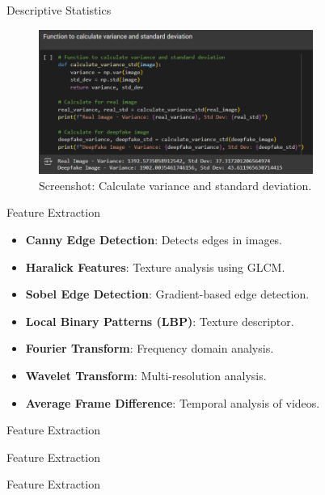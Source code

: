 \documentclass{beamer}
\begin{document}
\begin{frame}{Descriptive Statistics}
    \begin{figure}
        \centering
        \includegraphics[width=0.8\textwidth]{std.png} %
        \caption{Screenshot: Calculate variance and standard deviation.}
    \end{figure}

\end{frame}


\begin{frame}{Feature Extraction}
    \begin{itemize}
        \item \textbf{Canny Edge Detection}: Detects edges in images.
        \item \textbf{Haralick Features}: Texture analysis using GLCM.
        \item \textbf{Sobel Edge Detection}: Gradient-based edge detection.
        \item \textbf{Local Binary Patterns (LBP)}: Texture descriptor.
        \item \textbf{Fourier Transform}: Frequency domain analysis.
        \item \textbf{Wavelet Transform}: Multi-resolution analysis.
        \item \textbf{Average Frame Difference}: Temporal analysis of videos.
    \end{itemize}
    
\end{frame}

\begin{frame}{Feature Extraction}
 	\begin{figure}
    \end{figure}
\end{frame}
\begin{frame}{Feature Extraction}
 	\begin{figure}
    \end{figure}
\end{frame}
\begin{frame}{Feature Extraction}
 	\begin{figure}
    \end{figure}
\end{frame}
\end{document}
